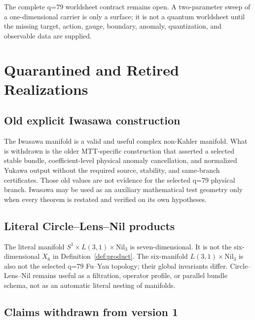 \documentclass[11pt]{article}
\begin{document}
The complete q=79 worldsheet contract remains open. A two-parameter sweep
of a one-dimensional carrier is only a surface;
it is not a quantum worldsheet until the missing target, action, gauge,
boundary, anomaly, quantization, and observable data are supplied.

\section{Quarantined and Retired Realizations}

\subsection{Old explicit Iwasawa construction}

The Iwasawa manifold is a valid and useful complex non-Kahler manifold.
What is withdrawn is the older MTT-specific construction that asserted a
selected stable bundle, coefficient-level physical anomaly cancellation, and
normalized Yukawa output without the required source, stability, and
same-branch certificates.  Those old values are not evidence for the selected
q=79 physical branch.  Iwasawa may be used as an auxiliary mathematical test
geometry only when every theorem is restated and verified on its own
hypotheses.

\subsection{Literal Circle--Lens--Nil products}

The literal manifold
$S^1\times L(3,1)\times\mathrm{Nil}_3$ is seven-dimensional.  It is not the
six-dimensional $X_6$ in Definition~\ref{def:product}.  The six-manifold
$L(3,1)\times\mathrm{Nil}_3$ is also not the selected q=79 Fu--Yau topology;
their global invariants differ.  Circle--Lens--Nil remains useful as a
filtration, operator profile, or parallel bundle schema, not as an automatic
literal nesting of manifolds.

\subsection{Claims withdrawn from version 1}
\end{document}
